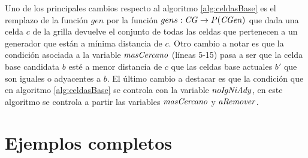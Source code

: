 \newpage
Uno de los principales cambios respecto al algoritmo \ref{alg:celdasBase} es el
remplazo de la función $gen$ por la función $gens : \mathit{CG} \rightarrow
P(\mathit{CGen})$ que dada una celda $c$ de la grilla devuelve el conjunto de
todas las celdas que pertenecen a un generador que están a mínima distancia de
$c$. Otro cambio a notar es que la condición asociada a la variable
$\mathit{masCercano}$ (líneas 5-15) pasa a ser que la celda base candidata $b$
esté a menor distancia de $c$ que las celdas base actuales $b'$ que son
iguales o adyacentes a $b$. El último cambio a destacar es que la condición que
en algoritmo \ref{alg:celdasBase} se controla con la variable
$\mathit{noIgNiAdy}$, en este algoritmo se controla a partir las variables
$\mathit{masCercano}$ y $\mathit{aRemover}$.
\newpage

\chapter{Ejemplos completos}
\begingroup
\small
